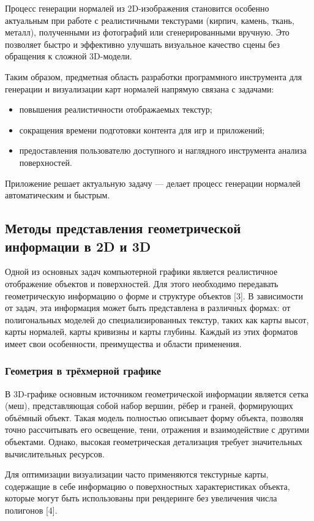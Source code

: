 Процесс генерации нормалей из 2D-изображения становится особенно актуальным при работе с реалистичными текстурами (кирпич, камень, ткань, металл), полученными из фотографий или сгенерированными вручную. Это позволяет быстро и эффективно улучшать визуальное качество сцены без обращения к сложной 3D-модели.

Таким образом, предметная область разработки программного инструмента для генерации и визуализации карт нормалей напрямую связана с задачами:
\begin{itemize}
	\item повышения реалистичности отображаемых текстур;
	\item сокращения времени подготовки контента для игр и приложений;
	\item предоставления пользователю доступного и наглядного инструмента анализа поверхностей.
\end{itemize}

Приложение решает актуальную задачу — делает процесс генерации нормалей автоматическим и быстрым.
\subsection{Методы представления геометрической информации в 2D и 3D}

Одной из основных задач компьютерной графики является реалистичное отображение объектов и поверхностей. Для этого необходимо передавать геометрическую информацию о форме и структуре объектов [3]. В зависимости от задач, эта информация может быть представлена в различных формах: от полигональных моделей до специализированных текстур, таких как карты высот, карты нормалей, карты кривизны и карты глубины. Каждый из этих форматов имеет свои особенности, преимущества и области применения.
\subsubsection{Геометрия в трёхмерной графике}

В 3D-графике основным источником геометрической информации является сетка (меш), представляющая собой набор вершин, рёбер и граней, формирующих объёмный объект. Такая модель полностью описывает форму объекта, позволяя точно рассчитывать его освещение, тени, отражения и взаимодействие с другими объектами. Однако, высокая геометрическая детализация требует значительных вычислительных ресурсов.

Для оптимизации визуализации часто применяются текстурные карты, содержащие в себе информацию о поверхностных характеристиках объекта, которые могут быть использованы при рендеринге без увеличения числа полигонов [4].

